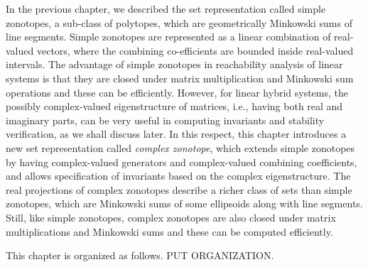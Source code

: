 In the previous chapter, we described the set representation called
simple zonotopes, a sub-class of polytopes, which are geometrically
Minkowski sums of line segments.  Simple zonotopes are represented as
a linear combination of real-valued vectors, where the combining
co-efficients are bounded inside real-valued intervals.  The advantage
of simple zonotopes in reachability analysis of linear systems is that
they are closed under matrix multiplication and Minkowski sum
operations and these can be efficiently.  However, for linear hybrid
systems, the possibly complex-valued eigenstructure of matrices, i.e.,
having both real and imaginary parts, can be very useful in computing
invariants and stability verification, as we shall discuss later.  In
this respect, this chapter introduces a new set representation
called \emph{complex zonotope}, which extends simple zonotopes by
having complex-valued generators and complex-valued combining
coefficients, and allows specification of invariants based on the
complex eigenstructure.  The real projections of complex zonotopes
describe a richer class of sets than simple zonotopes, which are
Minkowski sums of some ellipsoids along with line segments.  Still,
like simple zonotopes, complex zonotopes are also closed under matrix
multiplications and Minkowski sums and these can be computed
efficiently.

This chapter is organized as follows.  PUT ORGANIZATION.  

